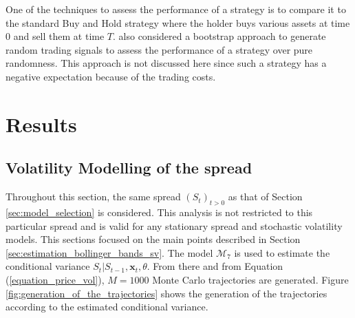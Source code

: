 \documentclass[11pt,a4,twosided,singlespacing,titlepagenumber=on]{scrreprt}
\numberwithin{equation}{chapter} %
\theoremstyle{remark}
\newcommand{\matr}[1]{\mathbf{#1}}
\begin{document}
One of the techniques to assess the performance of a strategy is to compare it to the standard Buy and Hold strategy where the holder buys various assets at time $0$ and sell them at time $T$. \cite{gatev2006} also considered a bootstrap approach to generate random trading signals to assess the performance of a strategy over pure randomness. This approach is not discussed here since such a strategy has a negative expectation because of the trading costs.

\chapter{Results}
\section{Volatility Modelling of the spread}
Throughout this section, the same spread $(S_t)_{t>0}$ as that of Section \ref{sec:model_selection} is considered. This analysis is not restricted to this particular spread and is valid for any stationary spread and stochastic volatility models. This sections focused on the main points described in Section \ref{sec:estimation_bollinger_bands_sv}. The model $\mathcal{M}_7$ is used to estimate the conditional variance $S_t | S_{t-1}, \matr{x}_t, \theta$. From there and from Equation (\ref{equation_price_vol}), $M = 1000$ Monte Carlo trajectories are generated. Figure \ref{fig:generation_of_the_trajectories} shows the generation of the trajectories according to the estimated conditional variance.
\end{document}
